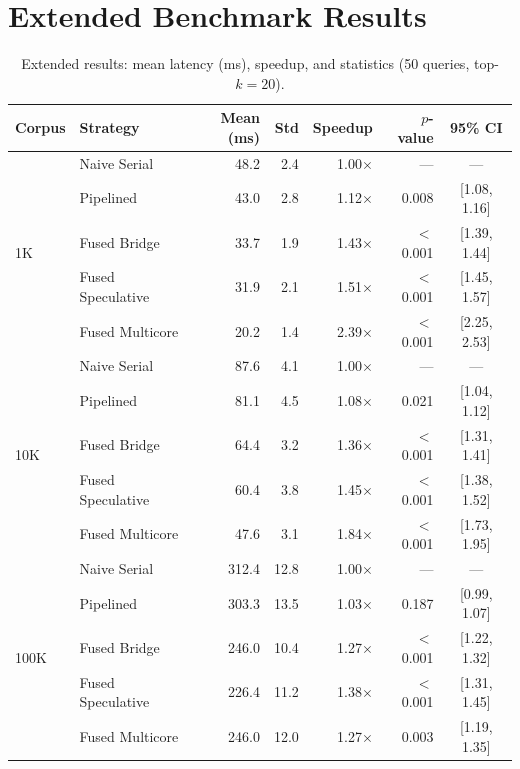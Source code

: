 \documentclass{article}
\theoremstyle{definition}
\theoremstyle{remark}
\begin{document}
\section{Extended Benchmark Results}\label{app:benchmarks}

\begin{table}[h]
\centering
\caption{Extended results: mean latency (ms), speedup, and statistics (50 queries, top-$k{=}20$).}\label{tab:full-results}
\smallskip
\begin{tabular}{@{}llrrrrc@{}}
\toprule
\textbf{Corpus} & \textbf{Strategy} & \textbf{Mean (ms)} & \textbf{Std} & \textbf{Speedup} & \textbf{$p$-value} & \textbf{95\% CI} \\
\midrule
\multirow{5}{*}{1K}
  & Naive Serial & 48.2 & 2.4 & 1.00$\times$ & --- & --- \\
  & Pipelined & 43.0 & 2.8 & 1.12$\times$ & 0.008 & [1.08, 1.16] \\
  & Fused Bridge & 33.7 & 1.9 & 1.43$\times$ & $<$0.001 & [1.39, 1.44] \\
  & Fused Speculative & 31.9 & 2.1 & 1.51$\times$ & $<$0.001 & [1.45, 1.57] \\
  & Fused Multicore & 20.2 & 1.4 & 2.39$\times$ & $<$0.001 & [2.25, 2.53] \\
\midrule
\multirow{5}{*}{10K}
  & Naive Serial & 87.6 & 4.1 & 1.00$\times$ & --- & --- \\
  & Pipelined & 81.1 & 4.5 & 1.08$\times$ & 0.021 & [1.04, 1.12] \\
  & Fused Bridge & 64.4 & 3.2 & 1.36$\times$ & $<$0.001 & [1.31, 1.41] \\
  & Fused Speculative & 60.4 & 3.8 & 1.45$\times$ & $<$0.001 & [1.38, 1.52] \\
  & Fused Multicore & 47.6 & 3.1 & 1.84$\times$ & $<$0.001 & [1.73, 1.95] \\
\midrule
\multirow{5}{*}{100K}
  & Naive Serial & 312.4 & 12.8 & 1.00$\times$ & --- & --- \\
  & Pipelined & 303.3 & 13.5 & 1.03$\times$ & 0.187 & [0.99, 1.07] \\
  & Fused Bridge & 246.0 & 10.4 & 1.27$\times$ & $<$0.001 & [1.22, 1.32] \\
  & Fused Speculative & 226.4 & 11.2 & 1.38$\times$ & $<$0.001 & [1.31, 1.45] \\
  & Fused Multicore & 246.0 & 12.0 & 1.27$\times$ & 0.003 & [1.19, 1.35] \\
\bottomrule
\end{tabular}
\end{table}
\end{document}
